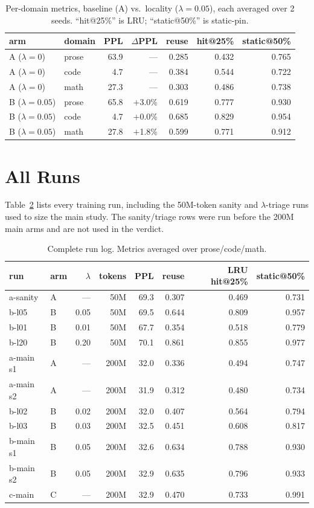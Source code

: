 \documentclass[11pt]{article}
\begin{document}
\begin{table}[h]\centering
\caption{Per-domain metrics, baseline (A) vs.\ locality ($\lambda{=}0.05$), each
averaged over 2 seeds. ``hit@25\%'' is LRU; ``static@50\%'' is static-pin.}
\label{tab:perdomain}
\small
\begin{tabular}{llrrrrr}
\toprule
arm & domain & PPL & $\Delta$PPL & reuse & hit@25\% & static@50\% \\
\midrule
A ($\lambda{=}0$) & prose & 63.9 & --- & 0.285 & 0.432 & 0.765 \\
A ($\lambda{=}0$) & code  & 4.7  & --- & 0.384 & 0.544 & 0.722 \\
A ($\lambda{=}0$) & math  & 27.3 & --- & 0.303 & 0.486 & 0.738 \\
\midrule
B ($\lambda{=}0.05$) & prose & 65.8 & $+$3.0\% & 0.619 & 0.777 & 0.930 \\
B ($\lambda{=}0.05$) & code  & 4.7  & $+$0.0\% & 0.685 & 0.829 & 0.954 \\
B ($\lambda{=}0.05$) & math  & 27.8 & $+$1.8\% & 0.599 & 0.771 & 0.912 \\
\bottomrule
\end{tabular}
\end{table}

\section{All Runs}
\label{app:allruns}
Table~\ref{tab:allruns} lists every training run, including the 50M-token sanity
and $\lambda$-triage runs used to size the main study. The sanity/triage rows
were run before the 200M main arms and are not used in the verdict.

\begin{table}[h]\centering
\caption{Complete run log. Metrics averaged over prose/code/math.}
\label{tab:allruns}
\small
\begin{tabular}{llrrrrrr}
\toprule
run & arm & $\lambda$ & tokens & PPL & reuse & LRU hit@25\% & static@50\% \\
\midrule
a-sanity  & A & ---  & 50M  & 69.3 & 0.307 & 0.469 & 0.731 \\
b-l05     & B & 0.05 & 50M  & 69.5 & 0.644 & 0.809 & 0.957 \\
b-l01     & B & 0.01 & 50M  & 67.7 & 0.354 & 0.518 & 0.779 \\
b-l20     & B & 0.20 & 50M  & 70.1 & 0.861 & 0.855 & 0.977 \\
\midrule
a-main s1 & A & ---  & 200M & 32.0 & 0.336 & 0.494 & 0.747 \\
a-main s2 & A & ---  & 200M & 31.9 & 0.312 & 0.480 & 0.734 \\
b-l02     & B & 0.02 & 200M & 32.0 & 0.407 & 0.564 & 0.794 \\
b-l03     & B & 0.03 & 200M & 32.5 & 0.451 & 0.608 & 0.817 \\
b-main s1 & B & 0.05 & 200M & 32.6 & 0.634 & 0.788 & 0.930 \\
b-main s2 & B & 0.05 & 200M & 32.9 & 0.635 & 0.796 & 0.933 \\
c-main    & C & ---  & 200M & 32.9 & 0.470 & 0.733 & 0.991 \\
\bottomrule
\end{tabular}
\end{table}
\end{document}
